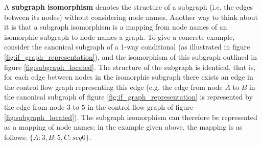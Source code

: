 A \textbf{subgraph isomorphism} denotes the structure of a subgraph (i.e. the edges between its nodes) without considering node names. Another way to think about it is that a subgraph isomorphism is a mapping from node names of an isomorphic subgraph to node names a graph. To give a concrete example, consider the canonical subgraph of a 1-way conditional (as illustrated in figure \ref{fig:if_graph_representation}), and the isomorphism of this subgraph outlined in figure \ref{fig:subgraph_located}. The structure of the subgraph is identical, that is, for each edge between nodes in the isomorphic subgraph there exists an edge in the control flow graph representing this edge (e.g. the edge from node $A$ to $B$ in the canonical subgraph of figure \ref{fig:if_graph_representation} is represented by the edge from node $3$ to $5$ in the control flow graph of figure \ref{fig:subgraph_located}). The subgraph isomorphism can therefore be represented as a mapping of node names; in the example given above, the mapping is as follows: $\{A: 3, B: 5, C: seq0\}$.

